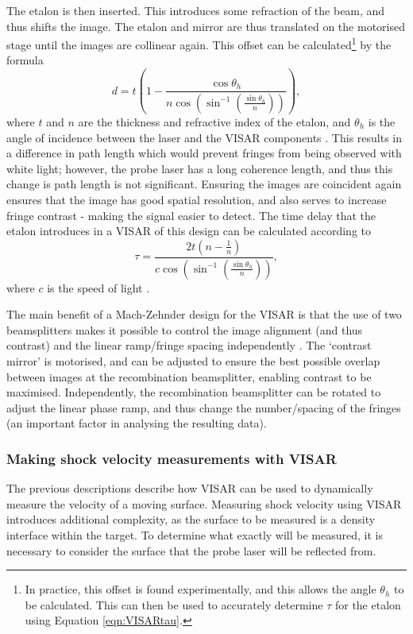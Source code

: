 The etalon is then inserted. This introduces some refraction of the beam, and thus shifts the image. The etalon and mirror are thus translated on the motorised stage until the images are collinear again. This offset can be calculated\footnote{In practice, this offset is found experimentally, and this allows the angle $\theta_h$ to be calculated. This can then be used to accurately determine $\tau$ for the etalon using Equation \ref{eqn:VISARtau}.} by the formula \begin{equation} d = t \left(1 - \frac{\cos\theta_h}{n \cos(\sin^{-1}(\frac{\sin\theta_h}{n}))}\right), \end{equation} where $t$ and $n$ are the thickness and refractive index of the etalon, and $\theta_h$ is the angle of incidence between the laser and the VISAR components \cite{Bolme2013}. This results in a difference in path length which would prevent fringes from being observed with white light; however, the probe laser has a long coherence length, and thus this change is path length is not significant. Ensuring the images are coincident again ensures that the image has good spatial resolution, and also serves to increase fringe contrast - making the signal easier to detect. The time delay that the etalon introduces in a VISAR of this design can be calculated according to \begin{equation} \tau = \frac{2t (n - \frac{1}{n})}{c \cos(\sin^{-1}(\frac{\sin\theta_h}{n}))}, \label{eqn:VISARtau} \end{equation} where $c$ is the speed of light \cite{Bolme2013}. 

The main benefit of a Mach-Zehnder design for the VISAR is that the use of two beamsplitters makes it possible to control the image alignment (and thus contrast) and the linear ramp/fringe spacing independently \cite{Celliers2004}. The `contrast mirror' is motorised, and can be adjusted to ensure the best possible overlap between images at the recombination beamsplitter, enabling contrast to be maximised. Independently, the recombination beamsplitter can be rotated to adjust the linear phase ramp, and thus change the number/spacing of the fringes (an important factor in analysing the resulting data). 

\subsubsection{Making shock velocity measurements with VISAR}

The previous descriptions describe how VISAR can be used to dynamically measure the velocity of a moving surface. Measuring shock velocity using VISAR introduces additional complexity, as the surface to be measured is a density interface within the target. To determine what exactly will be measured, it is necessary to consider the surface that the probe laser will be reflected from.

